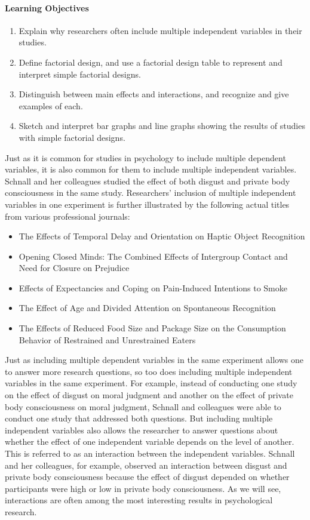  \paragraph{Learning Objectives}
  \begin{enumerate}
  \item Explain why researchers often include multiple independent variables in their studies.
  \item Define factorial design, and use a factorial design table to represent and interpret simple factorial designs.
  \item Distinguish between main effects and interactions, and recognize and give examples of each.
  \item Sketch and interpret bar graphs and line graphs showing the results of studies with simple factorial designs.
   \end{enumerate}


Just as it is common for studies in psychology to include multiple dependent variables, it is also common for them to include multiple independent variables. Schnall and her colleagues studied the effect of both disgust and private body consciousness in the same study. Researchers' inclusion of multiple independent variables in one experiment is further illustrated by the following actual titles from various professional journals:
\begin{itemize}
\item The Effects of Temporal Delay and Orientation on Haptic Object Recognition
\item Opening Closed Minds: The Combined Effects of Intergroup Contact and Need for Closure on Prejudice
\item Effects of Expectancies and Coping on Pain-Induced Intentions to Smoke
\item The Effect of Age and Divided Attention on Spontaneous Recognition
\item The Effects of Reduced Food Size and Package Size on the Consumption Behavior of Restrained and
Unrestrained Eaters
\end{itemize}

Just as including multiple dependent variables in the same experiment allows one to answer more research questions, so too does including multiple independent variables in the same experiment. For example, instead of conducting one study on the effect of disgust on moral judgment and another on the effect of private body consciousness on moral judgment, Schnall and colleagues were able to conduct one study that addressed both questions. But including multiple independent variables also allows the researcher to answer questions about whether the effect of one independent variable depends on the level of another. This is referred to as an interaction between the independent variables. Schnall and her colleagues, for example, observed an interaction between disgust and private body consciousness because the effect of disgust depended on whether participants were high or low in private body consciousness. As we will see, interactions are often among the most interesting results in psychological research.

